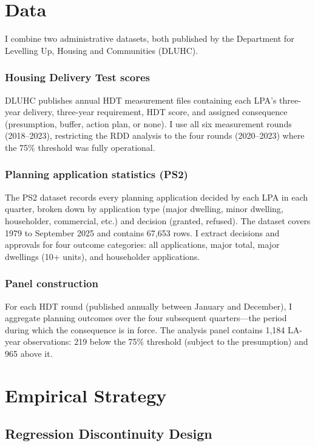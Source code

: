 \documentclass[12pt]{article}
\begin{document}
\section{Data}

I combine two administrative datasets, both published by the Department for Levelling Up, Housing and Communities (DLUHC).

\subsubsection*{Housing Delivery Test scores} DLUHC publishes annual HDT measurement files containing each LPA's three-year delivery, three-year requirement, HDT score, and assigned consequence (presumption, buffer, action plan, or none). I use all six measurement rounds (2018--2023), restricting the RDD analysis to the four rounds (2020--2023) where the 75\% threshold was fully operational.

\subsubsection*{Planning application statistics (PS2)} The PS2 dataset records every planning application decided by each LPA in each quarter, broken down by application type (major dwelling, minor dwelling, householder, commercial, etc.) and decision (granted, refused). The dataset covers 1979 to September 2025 and contains 67,653 rows. I extract decisions and approvals for four outcome categories: all applications, major total, major dwellings (10+ units), and householder applications.

\subsubsection*{Panel construction} For each HDT round (published annually between January and December), I aggregate planning outcomes over the four subsequent quarters---the period during which the consequence is in force. The analysis panel contains 1,184 LA-year observations: 219 below the 75\% threshold (subject to the presumption) and 965 above it.




\section{Empirical Strategy}

\subsection{Regression Discontinuity Design}
\end{document}

